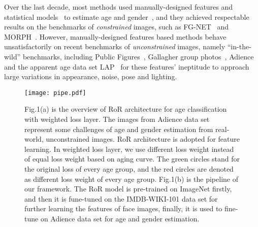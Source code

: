\documentclass[journal]{IEEEtran}
\begin{document}
Over the last decade, most methods used manually-designed features and statistical models~\cite{Ma1,Ma2} to estimate age and gender~\cite{AgeGabor,AgeSfp,AgeBifSVMSVR,AgeLR,AgeSVR,AgePls,AgeCCA}, and they achieved respectable results on the benchmarks of {\em constrained} images, such as FG-NET~\cite{FG-NETAAM} and MORPH~\cite{Morph}. 
However, manually-designed features based methods behave unsatisfactorily on recent benchmarks of {\em unconstrained} images, namely ``in-the-wild'' benchmarks, including Public Figures~\cite{Pubfig}, Gallagher group photos~\cite{Gallagher}, Adience~\cite{AgeSVMdrop} and the apparent age data set LAP~\cite{LAP} for these features' ineptitude to approach large variations in appearance, noise, pose and lighting.
\par 
\begin{figure}
\centering
\texttt{[image: pipe.pdf]}
\caption{Fig.1(a) is the overview of RoR architecture for age classification with weighted loss layer. The images from Adience data set represent some challenges of age and gender estimation from real-world, unconstrained images. RoR architecture is adopted for feature learning. In weighted loss layer, we use different loss weight instead of equal loss weight based on aging curve. The green circles stand for the original loss of every age group, and the red circles are denoted as different loss weight of every age group. Fig.1(b) is the pipeline of our framework. The RoR model is pre-trained on ImageNet firstly, and then it is fune-tuned on the IMDB-WIKI-101 data set for further learning the features of face images, finally, it is used to fine-tune on Adience data set for age and gender estimation.} \label{fig:pipe}
\end{figure}
\end{document}
